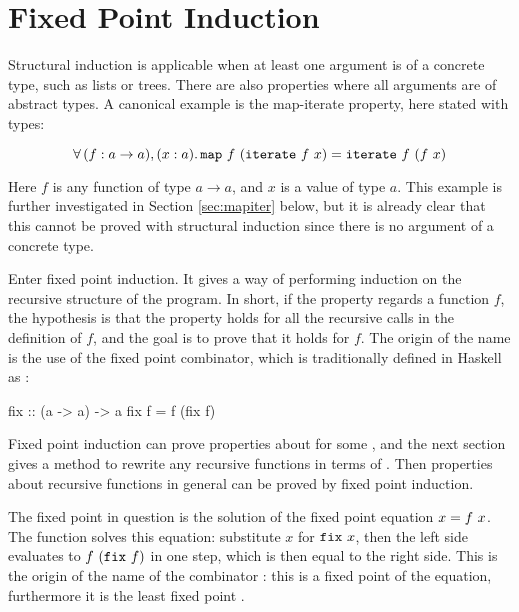 \section{Fixed Point Induction}
\label{sec:fixpoint}

Structural induction is applicable when at least one argument is of a
concrete type, such as lists or trees. There are also properties where
all arguments are of abstract types. A canonical example is the
map-iterate property, here stated with types:

\begin{equation*}
\forall \, (f : a \rightarrow a) , (x : a) . \, \texttt{map} \,\, f \,\, (\texttt{iterate} \,\, f \,\, x) =
           \texttt{iterate} \,\, f \,\, (f \,\, x)
\end{equation*}

Here $f$ is any function of type $a \rightarrow a$, and $x$ is a value
of type $a$. This example is further investigated in Section
\ref{sec:mapiter} below, but it is already clear that this cannot be
proved with structural induction since there is no argument of a
concrete type.

Enter fixed point induction. It gives a way of performing induction on
the recursive structure of the program. In short, if the property
regards a function $f$, the hypothesis is that the property holds for
all the recursive calls in the definition of $f$, and the goal is to
prove that it holds for $f$. The origin of the name is the use of the
fixed point combinator, which is traditionally defined in Haskell as
:

\begin{code}
fix :: (a -> a) -> a
fix f = f (fix f)
\end{code}

Fixed point induction can prove properties about  for some
, and the next section gives a method to rewrite any recursive
functions in terms of . Then properties about recursive
functions in general can be proved by fixed point induction.

The fixed point in question is the solution of the fixed point
equation $x = f \,\, x$. The function  solves this equation:
substitute $x$ for $\texttt{fix} \,\, x$, then the left side evaluates to $f
\,\, (\texttt{fix} \,\, f)$ in one step, which is then equal to the right
side. This is the origin of the name of the combinator : this
is a fixed point of the equation, furthermore it is the least fixed
point \citep{domains}.


